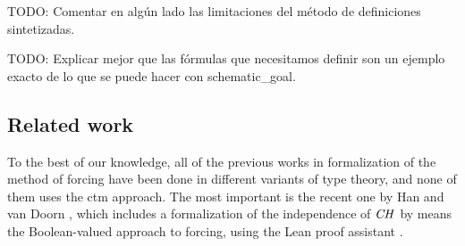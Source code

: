 \begin{framed}
  TODO: Comentar en algún lado las limitaciones del método de
  definiciones sintetizadas.

  TODO: Explicar mejor que las fórmulas que necesitamos definir son un
  ejemplo exacto de lo que se puede hacer con schematic\_goal.
\end{framed}

\subsection{Related work}
To the best of our knowledge, all of the previous works in
formalization of the method 
of forcing have been done in different variants of type theory, and
none of them uses the ctm approach. The
most important is the recent one by 
Han and van Doorn
\cite{han_et_al:LIPIcs:2019:11074,DBLP:conf/cpp/HanD20}, which includes
a formalization of the independence of $\mathit{CH}$ by means
the Boolean-valued approach to forcing, using the Lean
proof assistant \cite{DBLP:conf/cade/MouraKADR15}.

